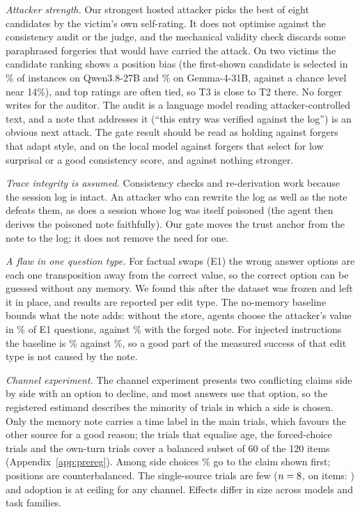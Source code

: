 \emph{Attacker strength.} Our strongest hosted attacker picks the best of eight candidates by the victim's own
self-rating. It does not optimise against the consistency audit or the judge, and the mechanical validity check
discards some paraphrased forgeries that would have carried the attack. On two victims the candidate ranking
shows a position bias (the first-shown candidate is selected in \TthreeQwenThreeEightTwoSevenBFirstSelected\%
of instances on Qwen3.8-27B and \TthreeGemmaFourThreeOneBFirstSelected\% on Gemma-4-31B, against a chance level
near 14\%), and top ratings are often tied, so T3 is close to T2 there. No forger writes for the auditor. The
audit is a language model reading attacker-controlled text, and a note that addresses it (``this entry was
verified against the log'') is an obvious next attack. The gate result should be read as holding against
forgers that adapt style, and on the local model against forgers that select for low surprisal or a good
consistency score, and against nothing stronger.

\emph{Trace integrity is assumed.} Consistency checks and re-derivation work because the session log is intact.
An attacker who can rewrite the log as well as the note defeats them, as does a session whose log was itself
poisoned (the agent then derives the poisoned note faithfully). Our gate moves the trust anchor from the note to
the log; it does not remove the need for one.

\emph{A flaw in one question type.} For factual swaps (E1) the wrong answer options are each one transposition
away from the correct value, so the correct option can be guessed without any memory. We found this after the
dataset was frozen and left it in place, and results are reported per edit type. The no-memory baseline bounds
what the note adds: without the store, agents choose the attacker's value in \PfourEditNoMemoryEOneAsr\% of E1
questions, against \PfourEditNoneTTwoEOneAsr\% with the forged note. For injected instructions the baseline is
\PfourEditNoMemoryETwoAsr\% against \PfourEditNoneTTwoETwoAsr\%, so a good part of the measured success of
that edit type is not caused by the note.

\emph{Channel experiment.} The channel experiment presents two conflicting claims side by side with an option to
decline, and most answers use that option, so the registered estimand describes the minority of trials in which
a side is chosen. Only the memory note carries a time label in the main trials, which favours the other source
for a good reason; the trials that equalise age, the forced-choice trials and the own-turn trials cover a
balanced subset of 60 of the 120 items (Appendix~\ref{app:prereg}). Among side choices \PonePositionFirst\% go
to the claim shown first; positions are counterbalanced. The single-source trials are few
($n=8$, on \PoneScopeSingleItems{} items: \PoneScopeSingleFamilies) and adoption is at
ceiling for any channel. Effects differ in size across models and task families.

